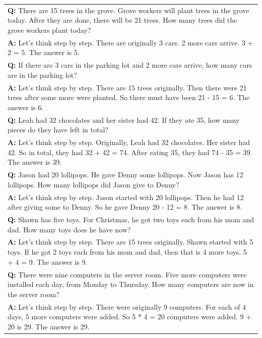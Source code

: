 \documentclass[11pt]{article}
\begin{document}
\begin{table}[ht]
    \centering
    \begin{tabularx}{\textwidth}{X}
    \toprule 
    \textbf{Q: }There are 15 trees in the grove. Grove workers will plant trees in the grove today. After they are done, there will be 21 trees. How many trees did the grove workers plant today? \\
    \textbf{A: } Let's think step by step. There are originally 3 cars. 2 more cars arrive. 3 + 2 = 5. The answer is 5. \\
    \hdashline 
    \textbf{Q: }If there are 3 cars in the parking lot and 2 more cars arrive, how many cars are in the parking lot? \\
    \textbf{A: } Let's think step by step. There are 15 trees originally. Then there were 21 trees after some more were planted. So there must have been 21 - 15 = 6. The answer is 6.\\
    \hdashline
    \textbf{Q: }Leah had 32 chocolates and her sister had 42. If they ate 35, how many pieces do they have left in total? \\
    \textbf{A: }Let's think step by step. Originally, Leah had 32 chocolates. Her sister had 42. So in total, they had 32 + 42 = 74. After eating 35, they had 74 - 35 = 39. The answer is 39.\\
    \hdashline
    \textbf{Q: }Jason had 20 lollipops. He gave Denny some lollipops. Now Jason has 12 lollipops. How many lollipops did Jason give to Denny? \\
    \textbf{A: }Let's think step by step. Jason started with 20 lollipops. Then he had 12 after giving some to Denny. So he gave Denny 20 - 12 = 8. The answer is 8.\\
    \hdashline
    \textbf{Q: }Shawn has five toys. For Christmas, he got two toys each from his mom and dad. How many toys does he have now? \\
    \textbf{A: }Let's think step by step. There are 15 trees originally. Shawn started with 5 toys. If he got 2 toys each from his mom and dad, then that is 4 more toys. 5 + 4 = 9. The answer is 9.\\
    \hdashline
    \textbf{Q: }There were nine computers in the server room. Five more computers were installed each day, from Monday to Thursday. How many computers are now in the server room? \\
    \textbf{A: }Let's think step by step. There were originally 9 computers. For each of 4 days, 5 more computers were added. So 5 * 4 = 20 computers were added. 9 + 20 is 29. The answer is 29.\\

\end{tabularx}
\end{table}
\end{document}
